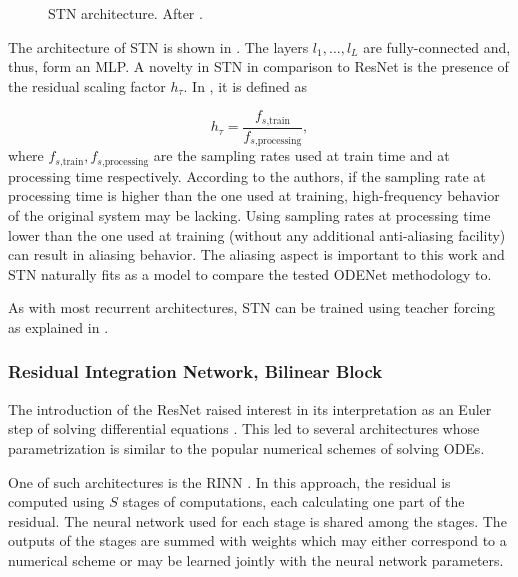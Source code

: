 \begin{figure}
  \centering
  \scalebox{0.7}{}
  \caption{\Acf{STN} architecture. After \cite{Parker2019}.}
  \label{fig:stn}
\end{figure}

The architecture of \ac{STN} is shown in . The layers $l_1, \dots, l_L$ are fully-connected and, thus, form an \ac{MLP}. A novelty in \ac{STN} in comparison to \ac{ResNet} is the presence of the residual scaling factor $h_\tau$. In \cite{Parker2019}, it is defined as

\begin{equation}
  h_\tau = \frac{f_{s\text{,train}}}{f_{s\text{,processing}}},
\end{equation}
where $f_{s\text{,train}}, f_{s\text{,processing}}$ are the sampling rates used at train time and at processing time respectively. According to the authors, if the sampling rate at processing time is higher than the one used at training, high-frequency behavior of the original system may be lacking. Using sampling rates at processing time lower than the one used at training (without any additional anti-aliasing facility) can result in aliasing behavior. The aliasing aspect is important to this work and \ac{STN} naturally fits as a model to compare the tested ODENet methodology to.

As with most recurrent architectures, \ac{STN} can be trained using teacher forcing as explained in  \cite{Parker2019}.

\subsubsection{Residual Integration Network, Bilinear Block}

The introduction of the \ac{ResNet} raised interest in its interpretation as an Euler step of solving differential equations \cite{Chen2018}.
This led to several architectures whose parametrization is similar to the popular numerical schemes of solving \acp{ODE}.

One of such architectures is the \acf{RINN} \cite{Ouala2019}.
In this approach, the residual is computed using $S$ stages of computations, each calculating one part of the residual. The neural network used for each stage is shared among the stages. The outputs of the stages are summed with weights which may either correspond to a numerical scheme or may be learned jointly with the neural network parameters.

